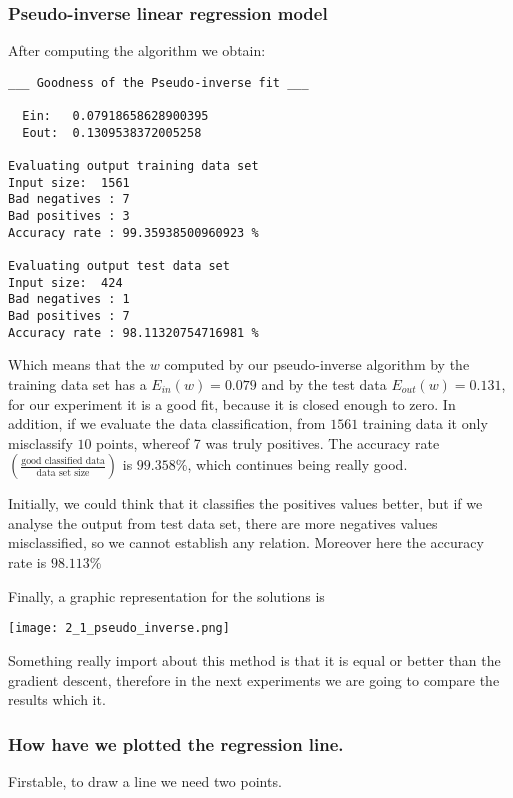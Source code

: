   \subsubsection{Pseudo-inverse linear regression model}

  After computing the algorithm we obtain:

\begin{verbatim}
___ Goodness of the Pseudo-inverse fit ___

  Ein:   0.07918658628900395
  Eout:  0.1309538372005258

Evaluating output training data set
Input size:  1561
Bad negatives : 7
Bad positives : 3
Accuracy rate : 99.35938500960923 %

Evaluating output test data set
Input size:  424
Bad negatives : 1
Bad positives : 7
Accuracy rate : 98.11320754716981 %

\end{verbatim}

  Which means that the $w$ computed by our pseudo-inverse algorithm by the training data set has a $E_{in}(w) = 0.079$ and by the test data $E_{out}(w) = 0.131$, for our experiment it is a good fit, because it is closed enough to zero. In addition, if we evaluate the data classification,
  from $1561$ training data it only misclassify $10$ points, whereof 7 was truly positives. The accuracy rate $(\frac{\text{good classified data}}{\text{data set size}})$
  is $99.358 \%$, which continues being really good.

  Initially, we could think that it classifies the positives values better, but if we analyse the output from test data set, there are more negatives values misclassified, so we cannot establish any relation. Moreover here the accuracy rate is $98.113 \%$

  Finally, a graphic representation for the solutions is

  
  \texttt{[image: 2\_1\_pseudo\_inverse.png]}


  Something really import about this method is that it is equal or better than the gradient descent, therefore in the next experiments
  we are going to compare the results which it. 

  \subsubsection{How have we plotted the regression line.}

  Firstable, to draw a line we need two points.


